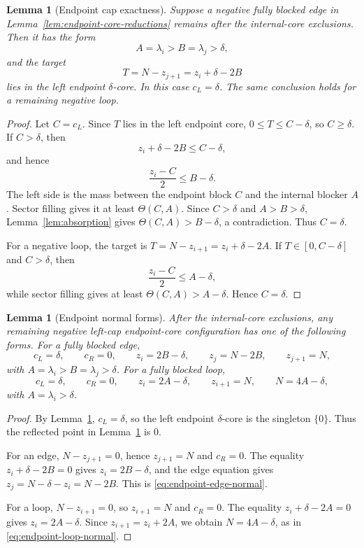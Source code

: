 \documentclass[11pt]{article}
\newtheorem{lemma}[theorem]{Lemma}
\begin{document}
\begin{lemma}[Endpoint cap exactness]\label{lem:cap-exact}
Suppose a negative fully blocked edge in Lemma~\ref{lem:endpoint-core-reductions} remains after the internal-core exclusions.  Then it has the form
\[
        A=\lambda_i>B=\lambda_j>\delta,
\]
and the target
\[
        T=N-z_{j+1}=z_i+\delta-2B
\]
lies in the left endpoint \(\delta\)-core.  In this case \(c_L=\delta\).  The same conclusion holds for a remaining negative loop.
\end{lemma}

\begin{proof}
Let \(C=c_L\).  Since \(T\) lies in the left endpoint core, \(0\le T\le C-\delta\), so \(C\ge\delta\).  If \(C>\delta\), then
\[
        z_i+\delta-2B\le C-\delta,
\]
and hence
\[
        \frac{z_i-C}{2}\le B-\delta.
\]
The left side is the mass between the endpoint block \(C\) and the internal blocker \(A\).  Sector filling gives it at least \(\Theta(C,A)\).  Since \(C>\delta\) and \(A>B>\delta\), Lemma~\ref{lem:absorption} gives \(\Theta(C,A)>B-\delta\), a contradiction.  Thus \(C=\delta\).

For a negative loop, the target is \(T=N-z_{i+1}=z_i+\delta-2A\).  If \(T\in[0,C-\delta]\) and \(C>\delta\), then
\[
        \frac{z_i-C}{2}\le A-\delta,
\]
while sector filling gives at least \(\Theta(C,A)>A-\delta\).  Hence \(C=\delta\).
\end{proof}

\begin{lemma}[Endpoint normal forms]\label{lem:endpoint-normal-forms}
After the internal-core exclusions, any remaining negative left-cap endpoint-core configuration has one of the following forms.  For a fully blocked edge,
\begin{equation}\label{eq:endpoint-edge-normal}
        c_L=\delta,
        \qquad
        c_R=0,
        \qquad
        z_i=2B-\delta,
        \qquad
        z_j=N-2B,
        \qquad
        z_{j+1}=N,
\end{equation}
with \(A=\lambda_i>B=\lambda_j>\delta\).  For a fully blocked loop,
\begin{equation}\label{eq:endpoint-loop-normal}
        c_L=\delta,
        \qquad
        c_R=0,
        \qquad
        z_i=2A-\delta,
        \qquad
        z_{i+1}=N,
        \qquad
        N=4A-\delta,
\end{equation}
with \(A=\lambda_i>\delta\).
\end{lemma}

\begin{proof}
By Lemma~\ref{lem:cap-exact}, \(c_L=\delta\), so the left endpoint \(\delta\)-core is the singleton \(\{0\}\).  Thus the reflected point in Lemma~\ref{lem:cap-exact} is \(0\).

For an edge, \(N-z_{j+1}=0\), hence \(z_{j+1}=N\) and \(c_R=0\).  The equality \(z_i+\delta-2B=0\) gives \(z_i=2B-\delta\), and the edge equation gives \(z_j=N-\delta-z_i=N-2B\).  This is \eqref{eq:endpoint-edge-normal}.

For a loop, \(N-z_{i+1}=0\), so \(z_{i+1}=N\) and \(c_R=0\).  The equality \(z_i+\delta-2A=0\) gives \(z_i=2A-\delta\).  Since \(z_{i+1}=z_i+2A\), we obtain \(N=4A-\delta\), as in \eqref{eq:endpoint-loop-normal}.
\end{proof}
\end{document}
